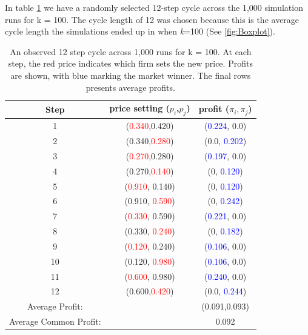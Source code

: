 \documentclass{article}
\begin{document}
In table \ref{tab:CycleLen12} we have a randomly selected 12-step cycle across the 1,000 simulation runs for k = 100. The cycle length of 12 was chosen because this is the average cycle length the simulations ended up in when \textit{k}=100 (See \ref{fig:Boxplot}). 
\begin{table}[H]
    \centering
    \begin{tabular}{|c|c|c|}
        \hline
        Step & price setting ($p_i$,$p_j$) &  profit ($\pi_i,\pi_j$) \\
        \hline
        1 & (\textcolor{red}{0.340},0.420) & (\textcolor{blue}{0.224}, 0.0)  \\
        \hline
        2 & (0.340,\textcolor{red}{0.280}) & (0.0, \textcolor{blue}{0.202}) \\
        \hline
        3 & (\textcolor{red}{0.270},0.280) & (\textcolor{blue}{0.197}, 0.0)  \\
        \hline
        4 & (0.270,\textcolor{red}{0.140}) & (0, \textcolor{blue}{0.120})  \\
        \hline
        5 & (\textcolor{red}{0.910}, 0.140) & (0, \textcolor{blue}{0.120})  \\
        \hline
        6 & (0.910, \textcolor{red}{0.590}) & (0, \textcolor{blue}{0.242})  \\
        \hline
        7 & (\textcolor{red}{0.330}, 0.590) & (\textcolor{blue}{0.221}, 0.0)  \\
        \hline
        8 & (0.330, \textcolor{red}{0.240}) & (0, \textcolor{blue}{0.182})  \\
        \hline
        9 & (\textcolor{red}{0.120}, 0.240) & (\textcolor{blue}{0.106}, 0.0)  \\
        \hline
        10 & (0.120, \textcolor{red}{0.980}) & (\textcolor{blue}{0.106}, 0.0)  \\
        \hline
        11 & (\textcolor{red}{0.600}, 0.980) & (\textcolor{blue}{0.240}, 0.0)  \\
        \hline
        12 & (0.600,\textcolor{red}{0.420}) & (0.0, \textcolor{blue}{0.244})  \\
        \hline
        Average Profit: & & (0.091,0.093) \\
         \hline
         Average Common Profit: & & 0.092 \\
         \hline
    \end{tabular}
    \caption{An observed 12 step cycle across 1,000 runs for k = 100. At each step, the red price indicates which firm sets the new price. Profits are shown, with blue marking the market winner. The final rows presents average profits.}
    \label{tab:CycleLen12}
\end{table}
\end{document}

